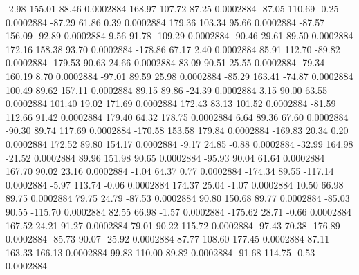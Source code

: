        -2.98      155.01       88.46     0.0002884
      168.97      107.72       87.25     0.0002884
      -87.05      110.69       -0.25     0.0002884
      -87.29       61.86        0.39     0.0002884
      179.36      103.34       95.66     0.0002884
      -87.57      156.09      -92.89     0.0002884
        9.56       91.78     -109.29     0.0002884
      -90.46       29.61       89.50     0.0002884
      172.16      158.38       93.70     0.0002884
     -178.86       67.17        2.40     0.0002884
       85.91      112.70      -89.82     0.0002884
     -179.53       90.63       24.66     0.0002884
       83.09       90.51       25.55     0.0002884
      -79.34      160.19        8.70     0.0002884
      -97.01       89.59       25.98     0.0002884
      -85.29      163.41      -74.87     0.0002884
      100.49       89.62      157.11     0.0002884
       89.15       89.86      -24.39     0.0002884
        3.15       90.00       63.55     0.0002884
      101.40       19.02      171.69     0.0002884
      172.43       83.13      101.52     0.0002884
      -81.59      112.66       91.42     0.0002884
      179.40       64.32      178.75     0.0002884
        6.64       89.36       67.60     0.0002884
      -90.30       89.74      117.69     0.0002884
     -170.58      153.58      179.84     0.0002884
     -169.83       20.34        0.20     0.0002884
      172.52       89.80      154.17     0.0002884
       -9.17       24.85       -0.88     0.0002884
      -32.99      164.98      -21.52     0.0002884
       89.96      151.98       90.65     0.0002884
      -95.93       90.04       61.64     0.0002884
      167.70       90.02       23.16     0.0002884
       -1.04       64.37        0.77     0.0002884
     -174.34       89.55     -117.14     0.0002884
       -5.97      113.74       -0.06     0.0002884
      174.37       25.04       -1.07     0.0002884
       10.50       66.98       89.75     0.0002884
       79.75       24.79      -87.53     0.0002884
       90.80      150.68       89.77     0.0002884
      -85.03       90.55     -115.70     0.0002884
       82.55       66.98       -1.57     0.0002884
     -175.62       28.71       -0.66     0.0002884
      167.52       24.21       91.27     0.0002884
       79.01       90.22      115.72     0.0002884
      -97.43       70.38     -176.89     0.0002884
      -85.73       90.07      -25.92     0.0002884
       87.77      108.60      177.45     0.0002884
       87.11      163.33      166.13     0.0002884
       99.83      110.00       89.82     0.0002884
      -91.68      114.75       -0.53     0.0002884
